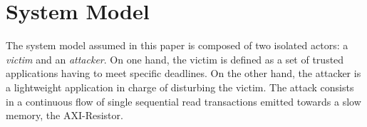\section{System Model}
    \label{sec:system_model}




    The system model assumed in this paper is composed of two isolated actors: a \emph{victim} and an \emph{attacker}.
    On one hand, the victim is defined as a set of trusted applications having to meet specific deadlines.
    On the other hand, the attacker is a lightweight application in charge of disturbing the victim.
    The attack consists in a continuous flow of single sequential read transactions emitted towards a slow memory, the AXI-Resistor.

